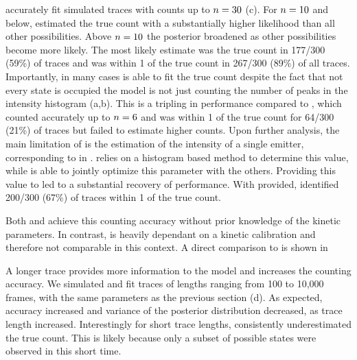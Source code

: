 \ours accurately fit simulated traces with counts up to $n=30$ (c).
	For $n=10$ and below, \ours estimated the true count with a substantially 
	higher likelihood than all other possibilities. 
	Above $n=10$ the posterior broadened as other possibilities become more likely. 
	The most likely estimate was the true count in 177/300 (59\%) of traces and 
	was within 1 of the true count in 267/300 (89\%) of all traces.
	Importantly, in many cases \ours is able to fit the true count despite the fact that 
	not every state is occupied \ie the model is not just counting the 
	number of peaks in the intensity histogram (a,b).
	This is a tripling in performance compared to \lbfcs, which counted 
	accurately up to $n=6$ and was within 1 of the true count for 64/300 (21\%) of traces 
	but failed to estimate higher counts.
	Upon further analysis, the main limitation of \lbfcs is the estimation of the 
	intensity of a single emitter, corresponding to \re in \ours. 
	\lbfcs relies on a histogram based method to determine this value, while 
	\ours is able to jointly optimize this parameter with the others.
	Providing this value to \lbfcs led to a substantial recovery of performance.
	With \re provided, \lbfcs identified 200/300 (67\%) of traces within 1 of the true count. 

Both \ours and \lbfcs achieve this counting accuracy without prior knowledge of the kinetic parameters.
	In contrast, \qpaint is heavily dependant on a kinetic calibration and 
	therefore not comparable in this context.
	A direct comparison to \qpaint is shown in 

A longer trace provides more
information to the model and increases the counting accuracy.
	We simulated and fit traces of lengths ranging from 100 to 10,000 frames, with the same parameters 
	as the previous section (d).
	As expected, accuracy increased and variance of the posterior distribution decreased, 
	as trace length increased.
	Interestingly for short trace lengths, \ours consistently underestimated the true count. 
	This is likely because only a subset of possible states were observed in this short time. %

